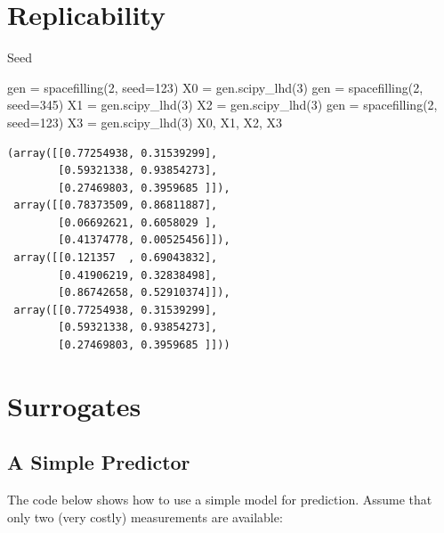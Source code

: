 \documentclass[
  letterpaper,
  DIV=11,
  numbers=noendperiod]{scrreprt}
\newenvironment{Shaded}{\begin{snugshade}}{\end{snugshade}}
\newcommand{\DecValTok}[1]{\textcolor[rgb]{0.68,0.00,0.00}{#1}}
\newcommand{\NormalTok}[1]{\textcolor[rgb]{0.00,0.23,0.31}{#1}}
\newcommand{\OperatorTok}[1]{\textcolor[rgb]{0.37,0.37,0.37}{#1}}
\begin{document}
\hypertarget{replicability}{%
\section{Replicability}\label{replicability}}

Seed

\begin{Shaded}
\begin{Highlighting}[]
\NormalTok{gen }\OperatorTok{=}\NormalTok{ spacefilling(}\DecValTok{2}\NormalTok{, seed}\OperatorTok{=}\DecValTok{123}\NormalTok{)}
\NormalTok{X0 }\OperatorTok{=}\NormalTok{ gen.scipy\_lhd(}\DecValTok{3}\NormalTok{)}
\NormalTok{gen }\OperatorTok{=}\NormalTok{ spacefilling(}\DecValTok{2}\NormalTok{, seed}\OperatorTok{=}\DecValTok{345}\NormalTok{)}
\NormalTok{X1 }\OperatorTok{=}\NormalTok{ gen.scipy\_lhd(}\DecValTok{3}\NormalTok{)}
\NormalTok{X2 }\OperatorTok{=}\NormalTok{ gen.scipy\_lhd(}\DecValTok{3}\NormalTok{)}
\NormalTok{gen }\OperatorTok{=}\NormalTok{ spacefilling(}\DecValTok{2}\NormalTok{, seed}\OperatorTok{=}\DecValTok{123}\NormalTok{)}
\NormalTok{X3 }\OperatorTok{=}\NormalTok{ gen.scipy\_lhd(}\DecValTok{3}\NormalTok{)}
\NormalTok{X0, X1, X2, X3}
\end{Highlighting}
\end{Shaded}

\begin{verbatim}
(array([[0.77254938, 0.31539299],
        [0.59321338, 0.93854273],
        [0.27469803, 0.3959685 ]]),
 array([[0.78373509, 0.86811887],
        [0.06692621, 0.6058029 ],
        [0.41374778, 0.00525456]]),
 array([[0.121357  , 0.69043832],
        [0.41906219, 0.32838498],
        [0.86742658, 0.52910374]]),
 array([[0.77254938, 0.31539299],
        [0.59321338, 0.93854273],
        [0.27469803, 0.3959685 ]]))
\end{verbatim}

\hypertarget{surrogates-1}{%
\section{Surrogates}\label{surrogates-1}}

\hypertarget{a-simple-predictor-1}{%
\subsection{A Simple Predictor}\label{a-simple-predictor-1}}

The code below shows how to use a simple model for prediction. Assume
that only two (very costly) measurements are available:
\end{document}
